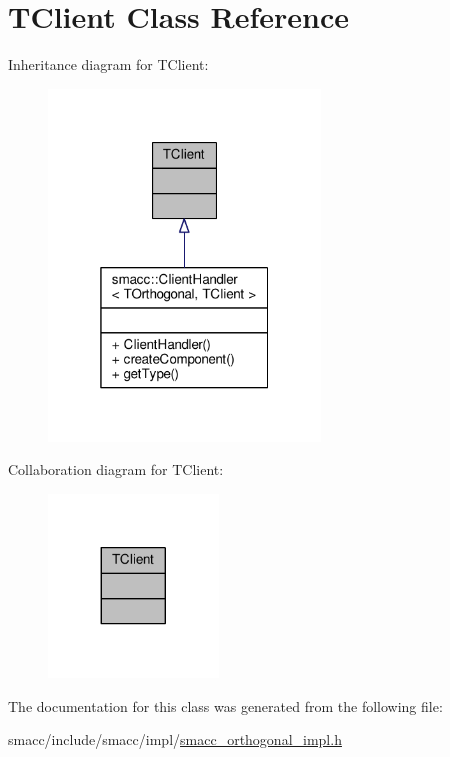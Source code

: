 \hypertarget{classTClient}{}\section{T\+Client Class Reference}
\label{classTClient}


Inheritance diagram for T\+Client\+:\nopagebreak
\begin{figure}[H]
\begin{center}
\leavevmode
\includegraphics[width=205pt]{classTClient__inherit__graph}
\end{center}
\end{figure}


Collaboration diagram for T\+Client\+:\nopagebreak
\begin{figure}[H]
\begin{center}
\leavevmode
\includegraphics[width=128pt]{classTClient__coll__graph}
\end{center}
\end{figure}


The documentation for this class was generated from the following file\+:\begin{DoxyCompactItemize}
\item 
smacc/include/smacc/impl/\hyperlink{smacc__orthogonal__impl_8h}{smacc\+\_\+orthogonal\+\_\+impl.\+h}\end{DoxyCompactItemize}
